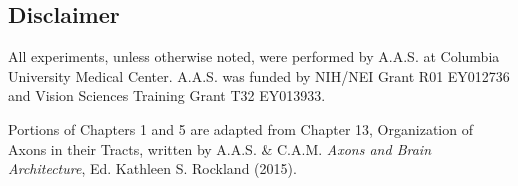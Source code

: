 \subsection*{Disclaimer}
\label{subsec:disclaimer}
All experiments, unless otherwise noted, were performed by A.A.S. at Columbia University Medical Center. 
A.A.S. was funded by NIH/NEI Grant R01 EY012736 and Vision Sciences Training Grant T32 EY013933.

Portions of Chapters 1 and 5 are adapted from Chapter 13, Organization of Axons in their Tracts, written by A.A.S. \& C.A.M. \emph{Axons and Brain Architecture}, Ed. Kathleen S. Rockland (2015).